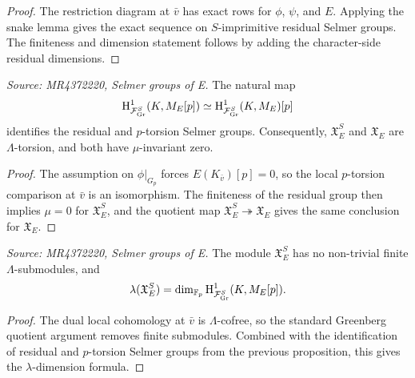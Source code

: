 \begin{proof}
The restriction diagram at \(\bar v\) has exact rows for \(\phi\), \(\psi\), and \(E\). Applying the snake lemma gives the exact sequence on \(S\)-imprimitive residual Selmer groups. The finiteness and dimension statement follows by adding the character-side residual dimensions.
\end{proof}

\begin{proposition}[Torsion and \(\mu=0\) for \(E\)]
  \label{prop:modp-E-tors}
  \textit{Source: MR4372220, Selmer groups of E.}
  The natural map
  \[
  \mathrm{H}^1_{\mathcal{F}_{\rm Gr}^S}(K,M_E[p]) \simeq \mathrm{H}^1_{\mathcal{F}_{\rm Gr}^S}(K,M_E)[p]
  \]
  identifies the residual and \(p\)-torsion Selmer groups. Consequently, \(\mathfrak X_E^S\) and \(\mathfrak X_E\) are \(\Lambda\)-torsion, and both have \(\mu\)-invariant zero.
\end{proposition}

\begin{proof}
The assumption on \(\phi|_{G_p}\) forces \(E(K_{\bar v})[p]=0\), so the local \(p\)-torsion comparison at \(\bar v\) is an isomorphism. The finiteness of the residual group then implies \(\mu=0\) for \(\mathfrak X_E^S\), and the quotient map \(\mathfrak X_E^S \twoheadrightarrow \mathfrak X_E\) gives the same conclusion for \(\mathfrak X_E\).
\end{proof}

\begin{corollary}
  \label{cor:lambda-E}
  \textit{Source: MR4372220, Selmer groups of E.}
  The module \(\mathfrak X_E^S\) has no non-trivial finite \(\Lambda\)-submodules, and
  \[
  \lambda(\mathfrak X_E^S)=\dim_{\mathbb F_p}\mathrm{H}^1_{\mathcal{F}_{\rm Gr}^S}(K,M_E[p]).
  \]
\end{corollary}

\begin{proof}
The dual local cohomology at \(\bar v\) is \(\Lambda\)-cofree, so the standard Greenberg quotient argument removes finite submodules. Combined with the identification of residual and \(p\)-torsion Selmer groups from the previous proposition, this gives the \(\lambda\)-dimension formula.
\end{proof}

